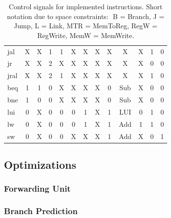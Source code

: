 \begin{table}[ht]
\begin{tabular}{|l|c|c|c|c|c|c|c|c|c|c|c|c|}
        jal        & X & X & 1 & 1 & X & X & X & X & X   & X & 1 & 0 \\
        jr         & X & X & 2 & X & X & X & X & X & X   & X & 0 & 0 \\
        jral       & X & X & 2 & 1 & X & X & X & X & X   & X & 1 & 0 \\
        \hline
        beq        & 1 & 1 & 0 & X & X & X & X & 0 & Sub & X & 0 & 0 \\
        bne        & 1 & 0 & 0 & X & X & X & X & 0 & Sub & X & 0 & 0 \\
        \hline
        lui        & 0 & X & 0 & 0 & 0 & 1 & X & 1 & LUI & 0 & 1 & 0 \\
        lw         & 0 & X & 0 & 0 & 0 & 1 & X & 1 & Add & 1 & 1 & 0 \\
        sw         & 0 & X & 0 & 0 & X & X & X & 1 & Add & X & 0 & 1 \\
        \hline
    \end{tabular}
    \caption{Control signals for implemented instructions. Short notation due to space constraints: $ $ B = Branch, J = Jump, L = Link, MTR = MemToReg, RegW = RegWrite, MemW = MemWrite.}
    \label{table:ctrlsignals}
\end{table}


\subsection{Optimizations}
\subsubsection*{Forwarding Unit}

\subsubsection*{Branch Prediction}

